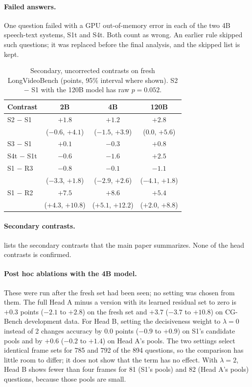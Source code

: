 \paragraph{Failed answers.}
One question failed with a GPU out-of-memory error in each of the two 4B speech-text systems, S1t and S4t.
Both count as wrong.
An earlier rule skipped such questions; it was replaced before the final analysis, and the skipped list is kept.

\begin{table}[t]
\centering
\small
\setlength{\tabcolsep}{3pt}
\begin{tabular}{@{}lccc@{}}
\toprule
Contrast & 2B & 4B & 120B \\
\midrule
S2 $-$ S1 & $+1.8$ & $+1.2$ & $+2.8$ \\
 & ($-0.6$, $+4.1$) & ($-1.5$, $+3.9$) & ($0.0$, $+5.6$) \\
S3 $-$ S1 & $+0.1$ & $-0.3$ & $+0.8$ \\
S4t $-$ S1t & $-0.6$ & $-1.6$ & $+2.5$ \\
S1 $-$ R3 & $-0.8$ & $-0.1$ & $-1.1$ \\
 & ($-3.3$, $+1.8$) & ($-2.9$, $+2.6$) & ($-4.1$, $+1.8$) \\
S1 $-$ R2 & $+7.5$ & $+8.6$ & $+5.4$ \\
 & ($+4.3$, $+10.8$) & ($+5.1$, $+12.2$) & ($+2.0$, $+8.8$) \\
\bottomrule
\end{tabular}
\caption{Secondary, uncorrected contrasts on fresh LongVideoBench (points, 95\% interval where shown). S2 $-$ S1 with the 120B model has raw $p{=}0.052$.}
\label{tab:s-lvb-secondary}
\end{table}

\paragraph{Secondary contrasts.}
 lists the secondary contrasts that the main paper summarizes.
None of the head contrasts is confirmed.

\paragraph{Post hoc ablations with the 4B model.}
These were run after the fresh set had been seen; no setting was chosen from them.
The full Head A minus a version with its learned residual set to zero is $+0.3$ points ($-2.1$ to $+2.8$) on the fresh set and $+3.7$ ($-3.7$ to $+10.8$) on CG-Bench development data.
For Head B, setting the decisiveness weight to $\lambda{=}0$ instead of 2 changes accuracy by $0.0$ points ($-0.9$ to $+0.9$) on S1's candidate pools and by $+0.6$ ($-0.2$ to $+1.4$) on Head A's pools.
The two settings select identical frame sets for 785 and 792 of the 894 questions, so the comparison has little room to differ; it does not show that the term has no effect.
With $\lambda{=}2$, Head B shows fewer than four frames for 81 (S1's pools) and 82 (Head A's pools) questions, because those pools are small.

